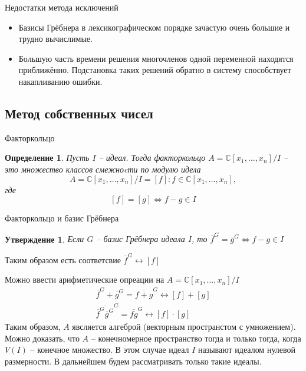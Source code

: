 \documentclass[notheorems,aspectratio=169]{beamer}
\newtheorem{definition}{Определение}
\newtheorem{statement}{Утверждение}
\begin{document}
\begin{frame}{Недостатки метода исключений}
    \begin{itemize}
        \item Базисы Грёбнера в лексикографическом порядке зачастую очень большие и трудно вычислимые.
        \item Большую часть времени решения многочленов одной переменной находятся приближённо. Подстановка таких решений обратно в систему способствует накапливанию ошибки.
    \end{itemize}
\end{frame}

\subsection{Метод собственных чисел} 
\begin{frame}{Факторкольцо}
    \begin{definition}
        Пусть $I$ -- идеал. 
        Тогда факторкольцо $A = \mathbb{C}[x_1, \dots, x_n]/I$ -- это множество классов смежноcти по модулю идела
        $$
            A = \mathbb{C}[x_1, \dots, x_n]/I = {[f]:f\in \mathbb{C}[x_1, \dots, x_n]},
        $$
        где $$[f] = [g] \Longleftrightarrow f-g\in I$$
    \end{definition}
\end{frame}

\begin{frame}{Факторкольцо и базис Грёбнера}
    \begin{statement}
        Если $G$ -- базис Грёбнера идеала $I$, то $\overline f^G = \overline g^G \Longleftrightarrow f-g\in I$
    \end{statement}
    Таким образом есть соответсвие $\overline f^G \longleftrightarrow [f]$
    
    Можно ввести арифметические опреации на  $A = \mathbb{C}[x_1, \dots, x_n]/I$
    \begin{align*}
        \overline f^G + \overline g^G = \overline{f+g}^G \longleftrightarrow [f] + [g] \\
        \overline{\overline f^G \overline g^G}^G = \overline{fg}^G \longleftrightarrow [f]\cdot[g]
    \end{align*}
    Таким образом, $A$ явсляется алгеброй (векторным пространстом с умножением). Можно доказать, что $A$ -- конечномерное пространство тогда и только тогда, когда $V(I)$ -- конечное множество. В этом случае идеал $I$ называют идеалом нулевой размерности. В дальнейшем будем рассматривать только такие идеалы.
\end{frame}
\end{document}
